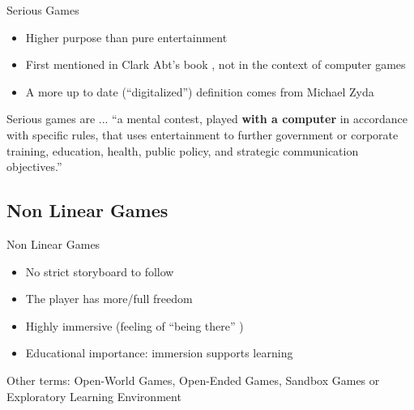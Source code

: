 \documentclass[compress]{beamer}
\begin{document}
\begin{frame}{Serious Games}
\pause
\begin{itemize}
\item Higher purpose than pure entertainment
\item First mentioned in Clark Abt's book \cite{Abt1987}, not in the context of computer games
\item A more up to date (``digitalized'') definition comes from Michael Zyda \cite{Zyda2005}
\end{itemize}
\pause
\begin{block}{Serious games are ...}
``a mental
contest, played \textbf{with a computer} in accordance with specific rules, that uses
entertainment to further government or corporate training, education, health,
public policy, and strategic communication objectives.'' \cite{Zyda2005}
\end{block}
\end{frame}

\subsection{Non Linear Games}

\begin{frame}{Non Linear Games}
\pause
\begin{itemize}
\item No strict storyboard to follow
\item The player has more/full freedom
\item Highly immersive (feeling of ``being there'' \cite{Psotka1995a})
\item Educational importance: immersion supports learning \cite{Zimmerman2000a, Seah2008a}
\end{itemize}
\pause
\begin{block}{Other terms:}
Open-World Games, Open-Ended Games, Sandbox Games or Exploratory Learning Environment
\end{block}
\end{frame}
\end{document}
